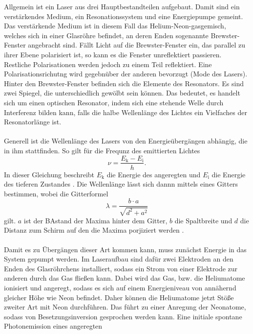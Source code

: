 Allgemein ist ein Laser aus drei Hauptbestandteilen aufgebaut. Damit sind ein 
verstärkendes Medium, ein Resonationssystem und eine Energiepumpe gemeint.
Das verstärkende Medium ist in diesem Fall das Helium-Neon-gasgemisch, welches sich 
in einer Glasröhre befindet, an deren Enden sogenannte Brewster-Fenster angebracht sind.
Fällt Licht auf die Brewster-Fenster ein, das parallel zu ihrer Ebene polarisiert ist,
so kann es die Fenster unreflektiert passieren. Restliche Polarisationen werden jedoch
zu einem Teil reflektiert. Eine Polarisationsrichutng wird gegebnüber der anderen 
bevorzugt (Mode des Lasers). Hinter den Brewster-Fenster befinden sich die 
Elemente des Resonators. Es sind zwei Spiegel, die unterschiedlich gewölbt sein können.
Das bedeutet, es handelt sich um einen optischen Resonator, indem sich eine 
stehende Welle durch Interferenz bilden kann, falls die halbe Wellenlänge des Lichtes ein 
Vielfaches der Resonatorlänge ist.\\\\
Generell ist die Wellenlänge des Lasers von den Energieübergängen abhängig, die in ihm 
stattfinden. So gilt für die Frequnz des emittierten Lichtes 
\begin{equation}
    \nu = \frac{ E_{\text{k}} - E_{\text{i}} }{h}.
    \label{eq1}
\end{equation}
In dieser Gleichung beschreibt $E_{\text{k}}$ die Energie des angeregten 
und $E_{\text{i}}$ die Energie des tieferen Zustandes \cite{1}.
Die Wellenlänge lässt sich dannn mittels eines Gitters bestimmen, wobei die 
Gitterformel 
\begin{equation}
    \lambda = \frac{b \cdot a}{\sqrt{d^2+a^2}}
    \label{eq2}
\end{equation}
gilt. $a$ ist der BAstand der Maxima hinter dem Gitter, $b$ die Spaltbreite und 
$d$ die Distanz zum Schirm auf den die Maxima porjiziert werden \cite{2}.\\\\
Damit es zu Übergängen dieser Art kommen kann, muss zunächst Energie in das 
System gepumpt werden.
Im Laseraufbau sind dafür zwei Elektroden an den Enden des Glasröhrchens installiert, 
sodass ein Strom von einer Elektrode zur anderen durch das Gas fließen kann.
Dabei wird das Gas, bzw. die Heliumatome ionisiert und angeregt,
sodass es sich auf einem Energieniveau von annähernd gleicher Höhe wie Neon befindet.
Daher können die Heliumatome jetzt Stöße zweiter Art mit Neon durchführen.
Das führt zu einer Anregung der Neonatome, sodass von Besetzungsinversion 
gesprochen werden kann. Eine initiale spontane Photonemission eines angeregten 
